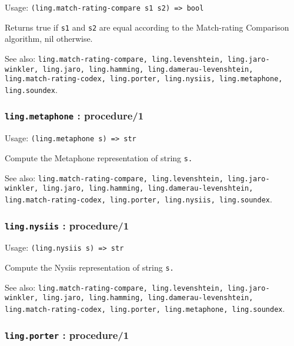 \documentclass[
]{article}
\newcommand{\passthrough}[1]{#1}
\begin{document}
Usage:
\passthrough{\lstinline!(ling.match-rating-compare s1 s2) => bool!}

Returns true if \passthrough{\lstinline!s1!} and
\passthrough{\lstinline!s2!} are equal according to the Match-rating
Comparison algorithm, nil otherwise.

See also:
\passthrough{\lstinline!ling.match-rating-compare, ling.levenshtein, ling.jaro-winkler, ling.jaro, ling.hamming, ling.damerau-levenshtein, ling.match-rating-codex, ling.porter, ling.nysiis, ling.metaphone, ling.soundex!}.

\hypertarget{ling.metaphone-procedure1}{%
\subsubsection{\texorpdfstring{\texttt{ling.metaphone} :
procedure/1}{ling.metaphone : procedure/1}}\label{ling.metaphone-procedure1}}

Usage: \passthrough{\lstinline!(ling.metaphone s) => str!}

Compute the Metaphone representation of string
\passthrough{\lstinline!s.!}

See also:
\passthrough{\lstinline!ling.match-rating-compare, ling.levenshtein, ling.jaro-winkler, ling.jaro, ling.hamming, ling.damerau-levenshtein, ling.match-rating-codex, ling.porter, ling.nysiis, ling.soundex!}.

\hypertarget{ling.nysiis-procedure1}{%
\subsubsection{\texorpdfstring{\texttt{ling.nysiis} :
procedure/1}{ling.nysiis : procedure/1}}\label{ling.nysiis-procedure1}}

Usage: \passthrough{\lstinline!(ling.nysiis s) => str!}

Compute the Nysiis representation of string \passthrough{\lstinline!s.!}

See also:
\passthrough{\lstinline!ling.match-rating-compare, ling.levenshtein, ling.jaro-winkler, ling.jaro, ling.hamming, ling.damerau-levenshtein, ling.match-rating-codex, ling.porter, ling.metaphone, ling.soundex!}.

\hypertarget{ling.porter-procedure1}{%
\subsubsection{\texorpdfstring{\texttt{ling.porter} :
procedure/1}{ling.porter : procedure/1}}\label{ling.porter-procedure1}}
\end{document}
